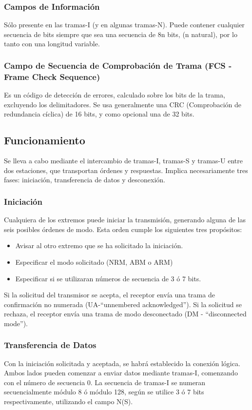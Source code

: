 \documentclass[withindex,glossary]{cam-thesis}
\begin{document}
\subsubsection{Campos de Información}
Sólo presente en las tramas-I (y en algunas tramas-N). Puede contener cualquier secuencia de bits siempre que sea una secuencia de 8n bits, (n natural), por lo tanto con una longitud variable.

\subsubsection{Campo de Secuencia de Comprobación de Trama (FCS - Frame Check Sequence)}
Es un código de detección de errores, calculado sobre los bits de la trama, excluyendo los delimitadores. Se usa generalmente una CRC (Comprobación de redundancia cíclica) de 16 bits, y como opcional una de 32 bits.

\subsection{Funcionamiento}
Se lleva a cabo mediante el intercambio de tramas-I, tramas-S y tramas-U entre dos estaciones, que transportan órdenes y respuestas. Implica necesariamente tres fases: iniciación, transferencia de datos y desconexión.

\subsubsection{Iniciación}
Cualquiera de los extremos puede iniciar la transmisión, generando alguna de las seis posibles órdenes de modo. Esta orden cumple los siguientes tres propósitos:
\begin{itemize}
	\item Avisar al otro extremo que se ha solicitado la iniciación.
    \item Especificar el modo solicitado (NRM, ABM o ARM)
    \item Especificar si se utilizaran números de secuencia de 3 ó 7 bits.
\end{itemize}
Si la solicitud del transmisor se acepta, el receptor envía una trama de confirmación no numerada (UA-“unnembered acknowledged”). Si la solicitud se rechaza, el receptor envía una trama de modo desconectado (DM - “disconnected mode”).

\subsubsection{Transferencia de Datos}
Con la iniciación solicitada y aceptada, se habrá establecido la conexión lógica. Ambos lados pueden comenzar a enviar datos mediante tramas-I, comenzando con el número de secuencia 0. La secuencia de tramas-I se numeran secuencialmente módulo 8 ó módulo 128, según se utilice 3 ó 7 bits respectivamente, utilizando el campo N(S).
\end{document}
